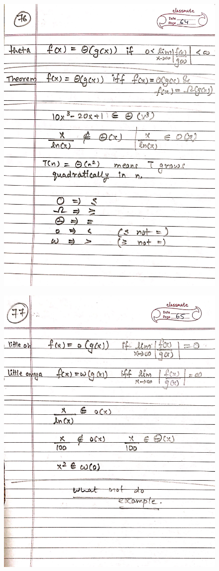 \begin{figure}[H]
    \centering
    \includegraphics[scale=0.25]{"./MIT 6.042J/MIT_6042J_076"}
\end{figure}
\newpage
\begin{figure}[H]
    \centering
    \includegraphics[scale=0.25]{"./MIT 6.042J/MIT_6042J_077"}
\end{figure}
